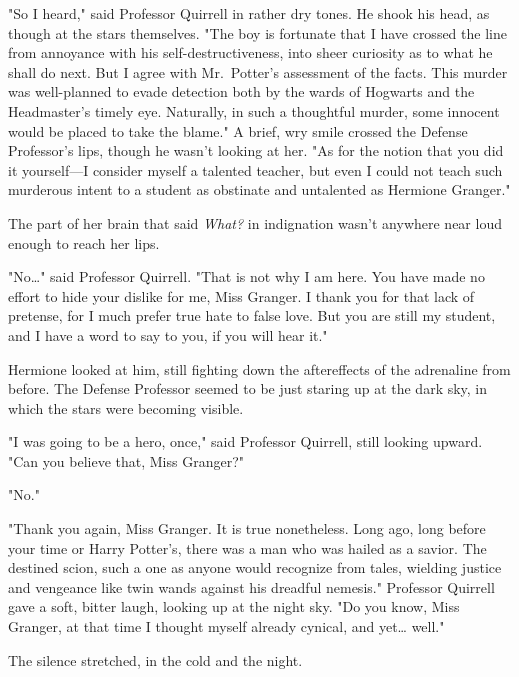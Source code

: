"So I heard," said Professor Quirrell in rather dry tones. He shook his head,
as though at the stars themselves. "The boy is fortunate that I have crossed
the line from annoyance with his self-destructiveness, into sheer curiosity as
to what he shall do next. But I agree with Mr.~Potter's assessment of the
facts. This murder was well-planned to evade detection both by the wards of
Hogwarts and the Headmaster's timely eye. Naturally, in such a thoughtful
murder, some innocent would be placed to take the blame." A brief, wry smile
crossed the Defense Professor's lips, though he wasn't looking at her. "As for
the notion that you did it yourself---I consider myself a talented teacher, but
even I could not teach such murderous intent to a student as obstinate and
untalented as Hermione Granger."

The part of her brain that said \emph{What?} in indignation wasn't anywhere
near loud enough to reach her lips.

"No{\ldots}" said Professor Quirrell. "That is not why I am here. You have made
no effort to hide your dislike for me, Miss Granger. I thank you for that lack
of pretense, for I much prefer true hate to false love. But you are still my
student, and I have a word to say to you, if you will hear it."

Hermione looked at him, still fighting down the aftereffects of the adrenaline
from before. The Defense Professor seemed to be just staring up at the dark
sky, in which the stars were becoming visible.

"I was going to be a hero, once," said Professor Quirrell, still looking
upward. "Can you believe that, Miss Granger?"

"No."

"Thank you again, Miss Granger. It is true nonetheless. Long ago, long before
your time or Harry Potter's, there was a man who was hailed as a savior. The
destined scion, such a one as anyone would recognize from tales, wielding
justice and vengeance like twin wands against his dreadful nemesis." Professor
Quirrell gave a soft, bitter laugh, looking up at the night sky. "Do you know,
Miss Granger, at that time I thought myself already cynical, and yet{\ldots}
well."

The silence stretched, in the cold and the night.

